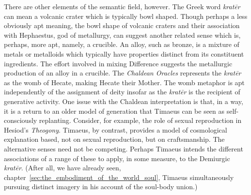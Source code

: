 There are other elements of the semantic field, however. The Greek word \emph{kratēr} can mean a volcanic crater which is typically bowl shaped. Though perhaps a less obviously apt meaning, the bowl shape of volcanic craters and their association with Hephaestus, god of metallurgy, can suggest another related sense which is, perhaps, more apt, namely, a crucible. An alloy, such as bronze, is a mixture of metals or metalloids which typically have properties distinct from its constituent ingredients. The effort involved in mixing Difference suggests the metallurgic production of an alloy in a crucible. The \emph{Chaldean Oracles} represents the \emph{kratēr} as the womb of Hecate, making Hecate their Mother. The womb metaphor is apt independently of the assignment of deity insofar as the \emph{kratēr} is the recipient of generative activity. One issue with the Chaldean interpretation is that, in a way, it is a return to an older model of generation that Timaeus can be seen as self-consciously replanting. Consider, for example, the role of sexual reproduction in Hesiod's \emph{Theogony}. Timaeus, by contrast, provides a model of cosmological explanation based, not on sexual reproduction, but on craftsmanship. The alternative senses need not be competing. Perhaps Timaeus intends the different associations of a range of these to apply, in some measure, to the Demiurgic \emph{kratēr}. (After all, we have already seen, chapter~\ref{sec:the_embodiment_of_the_world_soul}, Timaeus simultaneously pursuing distinct imagery in his account of the soul-body union.)


